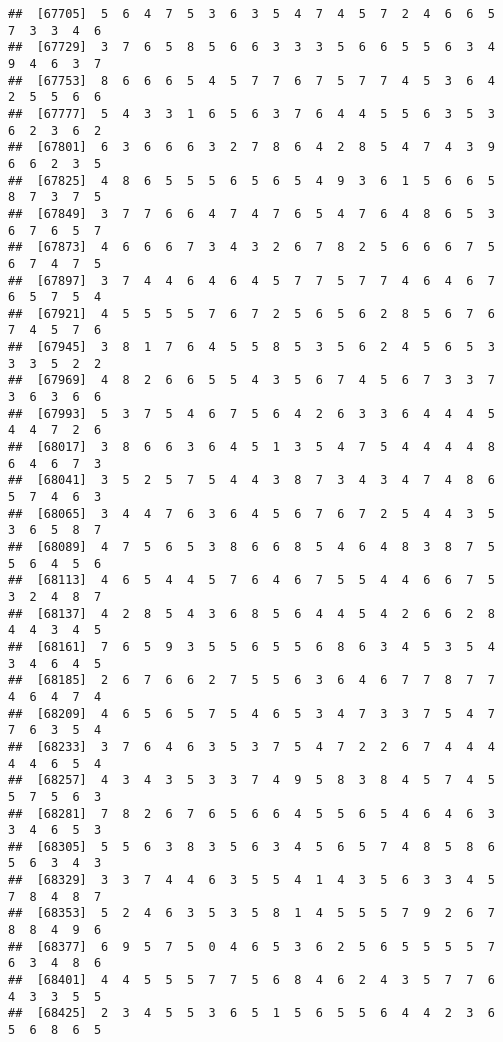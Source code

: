 \documentclass[
]{book}
\begin{document}
\begin{verbatim}
##  [67705]  5  6  4  7  5  3  6  3  5  4  7  4  5  7  2  4  6  6  5  7  3  3  4  6
##  [67729]  3  7  6  5  8  5  6  6  3  3  3  5  6  6  5  5  6  3  4  9  4  6  3  7
##  [67753]  8  6  6  6  5  4  5  7  7  6  7  5  7  7  4  5  3  6  4  2  5  5  6  6
##  [67777]  5  4  3  3  1  6  5  6  3  7  6  4  4  5  5  6  3  5  3  6  2  3  6  2
##  [67801]  6  3  6  6  6  3  2  7  8  6  4  2  8  5  4  7  4  3  9  6  6  2  3  5
##  [67825]  4  8  6  5  5  5  6  5  6  5  4  9  3  6  1  5  6  6  5  8  7  3  7  5
##  [67849]  3  7  7  6  6  4  7  4  7  6  5  4  7  6  4  8  6  5  3  6  7  6  5  7
##  [67873]  4  6  6  6  7  3  4  3  2  6  7  8  2  5  6  6  6  7  5  6  7  4  7  5
##  [67897]  3  7  4  4  6  4  6  4  5  7  7  5  7  7  4  6  4  6  7  6  5  7  5  4
##  [67921]  4  5  5  5  5  7  6  7  2  5  6  5  6  2  8  5  6  7  6  7  4  5  7  6
##  [67945]  3  8  1  7  6  4  5  5  8  5  3  5  6  2  4  5  6  5  3  3  3  5  2  2
##  [67969]  4  8  2  6  6  5  5  4  3  5  6  7  4  5  6  7  3  3  7  3  6  3  6  6
##  [67993]  5  3  7  5  4  6  7  5  6  4  2  6  3  3  6  4  4  4  5  4  4  7  2  6
##  [68017]  3  8  6  6  3  6  4  5  1  3  5  4  7  5  4  4  4  4  8  6  4  6  7  3
##  [68041]  3  5  2  5  7  5  4  4  3  8  7  3  4  3  4  7  4  8  6  5  7  4  6  3
##  [68065]  3  4  4  7  6  3  6  4  5  6  7  6  7  2  5  4  4  3  5  3  6  5  8  7
##  [68089]  4  7  5  6  5  3  8  6  6  8  5  4  6  4  8  3  8  7  5  5  6  4  5  6
##  [68113]  4  6  5  4  4  5  7  6  4  6  7  5  5  4  4  6  6  7  5  3  2  4  8  7
##  [68137]  4  2  8  5  4  3  6  8  5  6  4  4  5  4  2  6  6  2  8  4  4  3  4  5
##  [68161]  7  6  5  9  3  5  5  6  5  5  6  8  6  3  4  5  3  5  4  3  4  6  4  5
##  [68185]  2  6  7  6  6  2  7  5  5  6  3  6  4  6  7  7  8  7  7  4  6  4  7  4
##  [68209]  4  6  5  6  5  7  5  4  6  5  3  4  7  3  3  7  5  4  7  7  6  3  5  4
##  [68233]  3  7  6  4  6  3  5  3  7  5  4  7  2  2  6  7  4  4  4  4  4  6  5  4
##  [68257]  4  3  4  3  5  3  3  7  4  9  5  8  3  8  4  5  7  4  5  5  7  5  6  3
##  [68281]  7  8  2  6  7  6  5  6  6  4  5  5  6  5  4  6  4  6  3  3  4  6  5  3
##  [68305]  5  5  6  3  8  3  5  6  3  4  5  6  5  7  4  8  5  8  6  5  6  3  4  3
##  [68329]  3  3  7  4  4  6  3  5  5  4  1  4  3  5  6  3  3  4  5  7  8  4  8  7
##  [68353]  5  2  4  6  3  5  3  5  8  1  4  5  5  5  7  9  2  6  7  8  8  4  9  6
##  [68377]  6  9  5  7  5  0  4  6  5  3  6  2  5  6  5  5  5  5  7  6  3  4  8  6
##  [68401]  4  4  5  5  5  7  7  5  6  8  4  6  2  4  3  5  7  7  6  4  3  3  5  5
##  [68425]  2  3  4  5  5  3  6  5  1  5  6  5  5  6  4  4  2  3  6  5  6  8  6  5

\end{verbatim}
\end{document}
